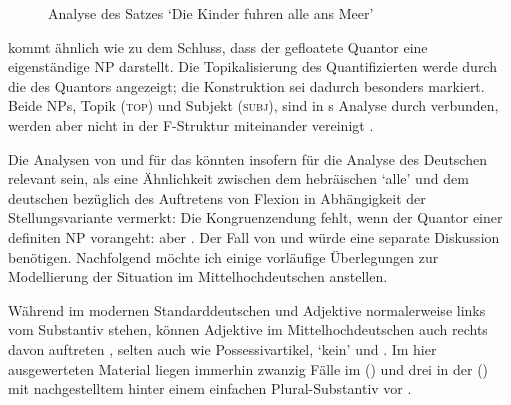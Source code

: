 \begin{figure}
	\caption{Analyse des Satzes  `Die Kinder
		fuhren alle ans Meer'}
	\label{fig:hebrqf}
\end{figure}

\citet[533--534]{spector2009} kommt ähnlich wie \citet[29]{pittner1995} zu dem
Schluss, dass der gefloatete Quantor eine eigenständige NP
darstellt. Die Topikalisierung des Quantifizierten werde durch die
 des Quantors angezeigt; die Konstruktion sei dadurch
besonders markiert. Beide NPs, Topik (\textsc{top}) und
Subjekt (\textsc{subj}), sind in \citeauthor{spector2009}s Analyse durch
 verbunden, werden aber nicht in der
F-Struktur miteinander vereinigt
\autocite[vgl.][99]{bresnanetal2016}.

Die Analysen von \citet{shlonsky1991} und \citet{spector2009} für das
 könnten insofern für die Analyse des Deutschen
relevant sein, als \citet[179]{merchant1996} eine Ähnlichkeit zwischen dem
hebräischen  `alle' und dem deutschen
 bezüglich des Auftretens von Flexion in Abhängigkeit der
Stellungsvariante vermerkt: Die Kongruenzendung
fehlt, wenn der Quantor einer definiten NP
vorangeht:  aber . Der Fall von  und
 würde eine separate Diskussion benötigen. Nachfolgend möchte ich
einige vorläufige Überlegungen zur Modellierung der Situation im
Mittelhochdeutschen anstellen.

Während im modernen Standarddeutschen  und
Adjektive normalerweise links vom Substantiv stehen,
können Adjektive im Mittelhochdeutschen auch rechts davon
auftreten \autocite[185--186, 237--243]{ksw2}, selten auch 
wie Possessivartikel,  `kein' und 
\autocite[515--517, 551--552, 623--624]{ksw2}. Im hier ausgewerteten Material
liegen immerhin zwanzig Fälle im 
(\CAO) und drei in der  (\KC) mit nachgestelltem
 hinter einem einfachen Plural-Substantiv vor
.



